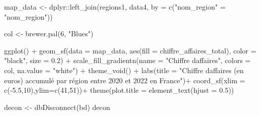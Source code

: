 \documentclass[mstat,12pt]{unswthesis}
\newenvironment{Shaded}{\begin{snugshade}}{\end{snugshade}}
\newcommand{\AttributeTok}[1]{\textcolor[rgb]{0.77,0.63,0.00}{#1}}
\newcommand{\DecValTok}[1]{\textcolor[rgb]{0.00,0.00,0.81}{#1}}
\newcommand{\FloatTok}[1]{\textcolor[rgb]{0.00,0.00,0.81}{#1}}
\newcommand{\FunctionTok}[1]{\textcolor[rgb]{0.00,0.00,0.00}{#1}}
\newcommand{\NormalTok}[1]{#1}
\newcommand{\OtherTok}[1]{\textcolor[rgb]{0.56,0.35,0.01}{#1}}
\newcommand{\SpecialCharTok}[1]{\textcolor[rgb]{0.00,0.00,0.00}{#1}}
\newcommand{\StringTok}[1]{\textcolor[rgb]{0.31,0.60,0.02}{#1}}
\begin{document}
\begin{Shaded}
\begin{Highlighting}[]
\NormalTok{map\_data }\OtherTok{\textless{}{-}}\NormalTok{ dplyr}\SpecialCharTok{::}\FunctionTok{left\_join}\NormalTok{(regions1, data4, }\AttributeTok{by =} \FunctionTok{c}\NormalTok{(}\StringTok{"nom\_region"} \OtherTok{=} \StringTok{"nom\_region"}\NormalTok{))}

\NormalTok{col }\OtherTok{\textless{}{-}} \FunctionTok{brewer.pal}\NormalTok{(}\DecValTok{6}\NormalTok{, }\StringTok{"Blues"}\NormalTok{)}

\FunctionTok{ggplot}\NormalTok{() }\SpecialCharTok{+}
  \FunctionTok{geom\_sf}\NormalTok{(}\AttributeTok{data =}\NormalTok{ map\_data, }\FunctionTok{aes}\NormalTok{(}\AttributeTok{fill =}\NormalTok{ chiffre\_affaires\_total), }\AttributeTok{color =} \StringTok{"black"}\NormalTok{, }\AttributeTok{size =} \FloatTok{0.2}\NormalTok{) }\SpecialCharTok{+}
  \FunctionTok{scale\_fill\_gradientn}\NormalTok{(}\AttributeTok{name =} \StringTok{"Chiffre d\textquotesingle{}affaires"}\NormalTok{, }\AttributeTok{colors =}\NormalTok{ col, }\AttributeTok{na.value =} \StringTok{"white"}\NormalTok{) }\SpecialCharTok{+}
  \FunctionTok{theme\_void}\NormalTok{() }\SpecialCharTok{+}
  \FunctionTok{labs}\NormalTok{(}\AttributeTok{title =} \StringTok{"Chiffre d\textquotesingle{}affaires (en euros) accumulé par région entre 2020 et 2022 en France"}\NormalTok{)}\SpecialCharTok{+}
  \FunctionTok{coord\_sf}\NormalTok{(}\AttributeTok{xlim =} \FunctionTok{c}\NormalTok{(}\SpecialCharTok{{-}}\FloatTok{5.5}\NormalTok{,}\DecValTok{10}\NormalTok{),}\AttributeTok{ylim=}\FunctionTok{c}\NormalTok{(}\DecValTok{41}\NormalTok{,}\DecValTok{51}\NormalTok{))}\SpecialCharTok{+}
  \FunctionTok{theme}\NormalTok{(}\AttributeTok{plot.title =} \FunctionTok{element\_text}\NormalTok{(}\AttributeTok{hjust =} \FloatTok{0.5}\NormalTok{))}

\NormalTok{decon }\OtherTok{\textless{}{-}} \FunctionTok{dbDisconnect}\NormalTok{(bd)}
\NormalTok{decon}
\StringTok{\textquotesingle{}\textquotesingle{}\textquotesingle{}}
\end{Highlighting}
\end{Shaded}
\end{document}
